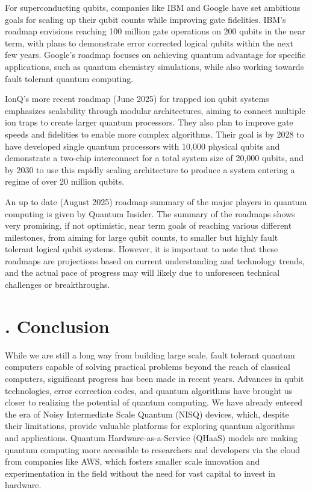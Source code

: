 \documentclass{elbioimp2}
\begin{document}
For superconducting qubits, companies like IBM and Google have set ambitious goals for scaling up their qubit counts while improving gate fidelities. IBM's roadmap envisions reaching 100 million gate operations on 200 qubits in the near term, with plans to demonstrate error corrected logical qubits within the next few years. Google's roadmap focuses on achieving quantum advantage for specific applications, such as quantum chemistry simulations, while also working towards fault tolerant quantum computing.

IonQ's more recent roadmap (June 2025) for trapped ion qubit systems emphasizes scalability through modular architectures, aiming to connect multiple ion traps to create larger quantum processors. They also plan to improve gate speeds and fidelities to enable more complex algorithms. Their goal is by 2028 to have developed single quantum processors with 10,000 physical qubits and demonstrate a two-chip interconnect for a total system size of 20,000 qubits\cite{ionq2025}, and by 2030 to use this rapidly scaling architecture to produce a system entering a regime of over 20 million qubits.

An up to date (August 2025) roadmap summary of the major players in quantum computing is given by Quantum Insider\cite{quantuminsider2025}. The summary of the roadmaps shows very promising, if not optimistic, near term goals of reaching various different milestones, from aiming for large qubit counts, to smaller but highly fault tolerant logical qubit systems. However, it is important to note that these roadmaps are projections based on current understanding and technology trends, and the actual pace of progress may will likely due to unforeseen technical challenges or breakthroughs.

\section{. Conclusion}
While we are still a long way from building large scale, fault tolerant quantum computers capable of solving practical problems beyond the reach of classical computers, significant progress has been made in recent years. Advances in qubit technologies, error correction codes, and quantum algorithms have brought us closer to realizing the potential of quantum computing. We have already entered the era of Noisy Intermediate Scale Quantum (NISQ) devices, which, despite their limitations, provide valuable platforms for exploring quantum algorithms and applications. Quantum Hardware-as-a-Service (QHaaS) models are making quantum computing more accessible to researchers and developers via the cloud from companies like AWS, which fosters smaller scale innovation and experimentation in the field without the need for vast capital to invest in hardware. 
\end{document}
